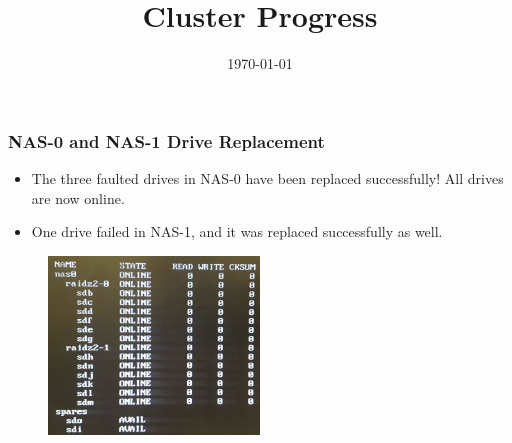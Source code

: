 \documentclass{beamer}
\title{Cluster Progress}
\date{\today}
\begin{document}

\begin{frame}
  \maketitle
\end{frame}



\begin{frame}
  \frametitle{NAS-0 and NAS-1 Drive Replacement}

  \begin{itemize}    
  \item The three faulted drives in NAS-0 have been replaced successfully! All drives are now online.
  \item One drive failed in NAS-1, and it was replaced successfully as well.
  \end{itemize}

  \begin{figure}[H]
    \begin{center}
      \includegraphics[width=0.5\textwidth]{nas0_drives_good.jpg}
    \end{center}
  \end{figure}

\end{frame}
\end{document}
